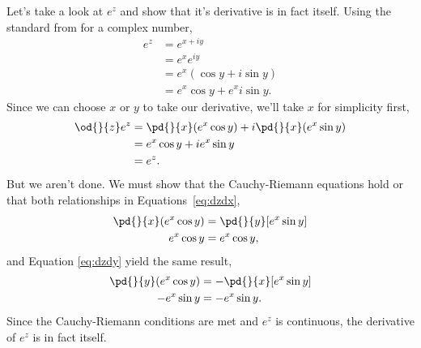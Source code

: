\documentclass[final,a4paper,12pt]{article}
\theoremstyle{definition}
\begin{document}
Let's take a look at $e^z$ and show that it's derivative is in fact itself.
Using the standard from for a complex number,
\begin{align*}
    e^z &= e^{x + i y} \\
    &= e^x e^{i y} \\
    &= e^x (\cos y + i \sin y) \\
    &= e^x \cos y + e^x i \sin y .
\end{align*}
Since we can choose $x$ or $y$ to take our derivative, we'll take $x$ for
simplicity first,
\begin{align*}
    \od{}{z} e^z &= \pd{}{x}(e^x \cos y) + i \pd{}{x} (e^x \sin y) \\
    &= e^x \cos y + i e^x \sin y \\
    &= e^z .
\end{align*}
But we aren't done.  We must show that the Cauchy-Riemann equations hold or that
both relationships in Equations~\ref{eq:dzdx},
\begin{align*}
    \pd{}{x} (e^x \cos y) &= \pd{}{y} [e^x \sin y] \\
    e^x \cos y &= e^x \cos y ,
\end{align*}
and Equation \ref{eq:dzdy} yield the same
result,
\begin{align*}
    \pd{}{y} (e^x \cos y) &= -\pd{}{x} [e^x \sin y] \\
    - e^x \sin y &= - e^x \sin y .
\end{align*}
Since the Cauchy-Riemann conditions are met and $e^z$ is continuous, the
derivative of $e^z$ is in fact itself.
\end{document}
